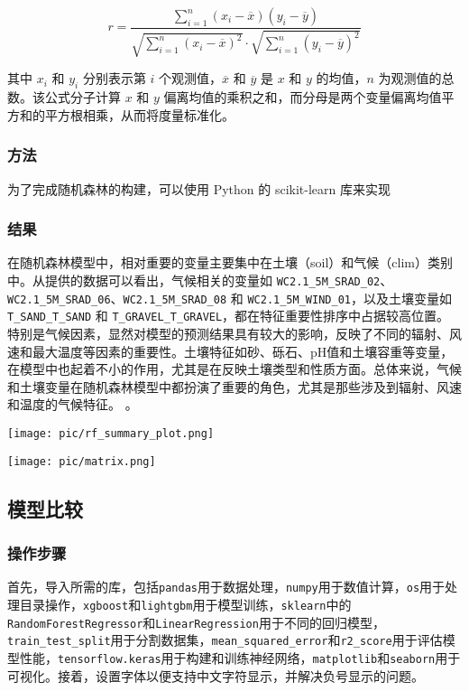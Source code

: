 \documentclass{article}
\begin{document}
	\[
	r = \frac{\sum_{i=1}^{n} (x_i - \overline{x})(y_i - \overline{y})}{\sqrt{\sum_{i=1}^{n} (x_i - \overline{x})^2} \cdot \sqrt{\sum_{i=1}^{n} (y_i - \overline{y})^2}}
	\]
	
	其中 \( x_i \) 和 \( y_i \) 分别表示第 \( i \) 个观测值，\( \overline{x} \) 和 \( \overline{y} \) 是 \( x \) 和 \( y \) 的均值，\( n \) 为观测值的总数。该公式分子计算 \( x \) 和 \( y \) 偏离均值的乘积之和，而分母是两个变量偏离均值平方和的平方根相乘，从而将度量标准化。
	
		\subsubsection{方法}
	
		为了完成随机森林的构建，可以使用 Python 的 scikit-learn 库来实现
	\subsubsection{结果}
	
在随机森林模型中，相对重要的变量主要集中在土壤（soil）和气候（clim）类别中。从提供的数据可以看出，气候相关的变量如 \texttt{WC2.1\_5M\_SRAD\_02}、\texttt{WC2.1\_5M\_SRAD\_06}、\texttt{WC2.1\_5M\_SRAD\_08} 和 \texttt{WC2.1\_5M\_WIND\_01}，以及土壤变量如 \texttt{T\_SAND\_T\_SAND} 和 \texttt{T\_GRAVEL\_T\_GRAVEL}，都在特征重要性排序中占据较高位置。特别是气候因素，显然对模型的预测结果具有较大的影响，反映了不同的辐射、风速和最大温度等因素的重要性。土壤特征如砂、砾石、pH值和土壤容重等变量，在模型中也起着不小的作用，尤其是在反映土壤类型和性质方面。总体来说，气候和土壤变量在随机森林模型中都扮演了重要的角色，尤其是那些涉及到辐射、风速和温度的气候特征。
。
\par
\texttt{[image: pic/rf\_summary\_plot.png]} %
\par

\texttt{[image: pic/matrix.png]} %

	\subsection{模型比较}

\subsubsection{操作步骤}
首先，导入所需的库，包括\texttt{pandas}用于数据处理，\texttt{numpy}用于数值计算，\texttt{os}用于处理目录操作，\texttt{xgboost}和\texttt{lightgbm}用于模型训练，\texttt{sklearn}中的\texttt{RandomForestRegressor}和\texttt{LinearRegression}用于不同的回归模型，\texttt{train\_test\_split}用于分割数据集，\texttt{mean\_squared\_error}和\texttt{r2\_score}用于评估模型性能，\texttt{tensorflow.keras}用于构建和训练神经网络，\texttt{matplotlib}和\texttt{seaborn}用于可视化。接着，设置字体以便支持中文字符显示，并解决负号显示的问题。
\end{document}
